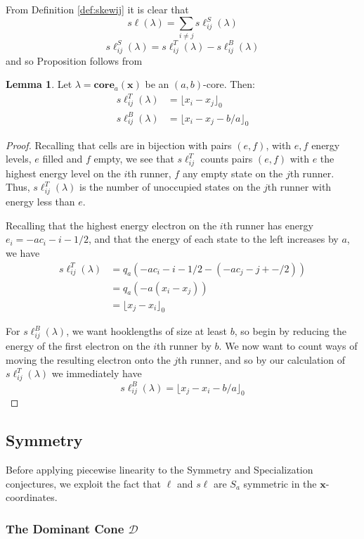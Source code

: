 \documentclass{amsart}[12pt]
\theoremstyle{definition}
\newtheorem{lemma}[dummy]{Lemma}
\newcommand{\core}{\mathbf{core}}
\newcommand{\sk}{s\ell}
\newcommand{\dominant}{\mathcal{D}}
\begin{document}
From Definition \ref{def:skewij} it is clear that
$$\sk(\lambda)=\sum_{i\neq j}\sk^S_{ij}(\lambda)$$
$$\sk_{ij}^S(\lambda)=\sk_{ij}^T(\lambda)-\sk^B_{ij}(\lambda)$$
and so Proposition follows from

\begin{lemma}
Let $\lambda=\core_a(\mathbf{x})$ be an $(a,b)$-core.  Then:
\begin{align*}
\sk_{ij}^T(\lambda)&=\lfloor x_i-x_j\rfloor_0 \\
\sk_{ij}^B(\lambda)&=\lfloor x_i-x_j-b/a\rfloor_0
\end{align*}
\end{lemma}

\begin{proof}
Recalling that cells are in bijection with pairs $(e, f)$, with $e, f$ energy levels, $e$ filled and $f$ empty, we see that $\sk^T_{ij}$ counts pairs $(e, f)$ with $e$ the highest energy level on the $i$th runner, $f$ any empty state on the $j$th runner.  Thus, $\sk^T_{ij}(\lambda)$ is the number of unoccupied states on the $j$th runner with energy less than $e$.

Recalling that the highest energy electron on the $i$th runner has energy $e_i=-ac_i-i-1/2$, and that the energy of each state to the left increases by $a$, we have  
\begin{align*}
\sk_{ij}^T(\lambda)&=q_a\left(-ac_i-i-1/2-(-ac_j-j+-/2)\right) \\
&=q_a(-a(x_i-x_j)) \\
&=\lfloor x_j-x_i\rfloor_0
\end{align*}

For $\sk_{ij}^B(\lambda)$, we want hooklengths of size at least $b$, so begin by reducing the energy of the first electron on the $i$th runner by $b$.  We now want to count ways of moving the resulting electron onto the $j$th runner, and so by our calculation of $\sk_{ij}^T(\lambda)$ we immediately have
$$\sk_{ij}^B(\lambda)=\lfloor x_j-x_i-b/a\rfloor_0$$
\end{proof}

\subsection{Symmetry}

Before applying piecewise linearity to the Symmetry and Specialization conjectures, we exploit the fact that $\ell$ and $\sk$ are $S_a$ symmetric in the $\mathbf{x}$-coordinates.


\subsubsection{The Dominant Cone $\dominant$}
\end{document}
